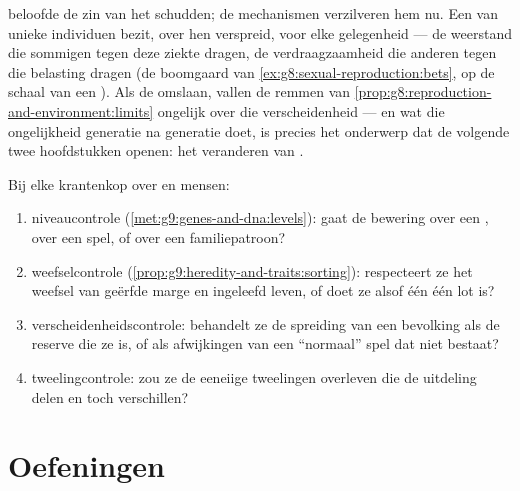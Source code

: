 \begin{proposition}\label{prop:g9:unique-individuals:reserve}
 beloofde de zin van het
schudden; de mechanismen verzilveren hem nu. Een  van unieke
individuen bezit, over hen verspreid,  voor elke
gelegenheid --- de weerstand die sommigen tegen deze ziekte
dragen, de verdraagzaamheid die anderen tegen die belasting
dragen (de boomgaard van
\cref{ex:g8:sexual-reproduction:bets}, op de schaal van een
). Als de  omslaan, vallen de remmen van
\cref{prop:g8:reproduction-and-environment:limits} ongelijk over
die verscheidenheid --- en wat die ongelijkheid generatie na
generatie doet, is precies het onderwerp dat de volgende twee
hoofdstukken openen: het veranderen van .
\end{proposition}
\admitted

\begin{method}\label{met:g9:unique-individuals:claims}
Bij elke krantenkop over  en mensen:
\begin{enumerate}
  \item niveaucontrole (\cref{met:g9:genes-and-dna:levels}):
        gaat de bewering over een , over een spel, of over een
        familiepatroon?
  \item weefselcontrole
        (\cref{prop:g9:heredity-and-traits:sorting}): respecteert
        ze het weefsel van geërfde marge en ingeleefd leven, of
        doet ze alsof één  één lot is?
  \item verscheidenheidscontrole: behandelt ze de spreiding van
        een bevolking als de reserve die ze is, of als
        afwijkingen van een ``normaal'' spel dat niet bestaat?
  \item tweelingcontrole: zou ze de eeneiige tweelingen
        overleven die de uitdeling delen en toch verschillen?
\end{enumerate}
\end{method}

\section{Oefeningen}


